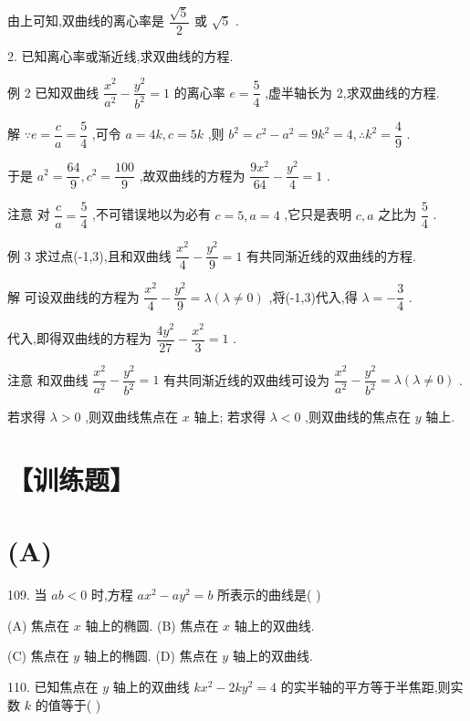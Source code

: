 由上可知,双曲线的离心率是 $\dfrac{\sqrt{5}}{2}$ 或 $\sqrt{5}$ .

2. 已知离心率或渐近线,求双曲线的方程.

例 2 已知双曲线 $\dfrac{{x}^{2}}{{a}^{2}} - \dfrac{{y}^{2}}{{b}^{2}} = 1$ 的离心率 $e = \dfrac{5}{4}$ ,虚半轴长为 2,求双曲线的方程.

解 $\because e = \dfrac{c}{a} = \dfrac{5}{4}$ ,可令 $a = {4k},c = {5k}$ ,则 ${b}^{2} = {c}^{2} - {a}^{2} = 9{k}^{2} = 4,\therefore {k}^{2} = \dfrac{4}{9}$ .

于是 ${a}^{2} = \dfrac{64}{9},{c}^{2} = \dfrac{100}{9}$ ,故双曲线的方程为 $\dfrac{9{x}^{2}}{64} - \dfrac{{y}^{2}}{4} = 1$ .

注意 对 $\dfrac{c}{a} = \dfrac{5}{4}$ ,不可错误地以为必有 $c = 5,a = 4$ ,它只是表明 $c,a$ 之比为 $\dfrac{5}{4}$ .

例 3 求过点(-1,3),且和双曲线 $\dfrac{{x}^{2}}{4} - \dfrac{{y}^{2}}{9} = 1$ 有共同渐近线的双曲线的方程.

解 可设双曲线的方程为 $\dfrac{{x}^{2}}{4} - \dfrac{{y}^{2}}{9} = \lambda \left( {\lambda  \neq  0}\right)$ ,将(-1,3)代入,得 $\lambda  =  - \dfrac{3}{4}$ .

代入,即得双曲线的方程为 $\dfrac{4{y}^{2}}{27} - \dfrac{{x}^{2}}{3} = 1$ .

注意 和双曲线 $\dfrac{{x}^{2}}{{a}^{2}} - \dfrac{{y}^{2}}{{b}^{2}} = 1$ 有共同渐近线的双曲线可设为 $\dfrac{{x}^{2}}{{a}^{2}} - \dfrac{{y}^{2}}{{b}^{2}} = \lambda \left( {\lambda  \neq  0}\right)$ .

若求得 $\lambda  > 0$ ,则双曲线焦点在 $x$ 轴上; 若求得 $\lambda  < 0$ ,则双曲线的焦点在 $y$ 轴上.

\section*{【训练题】}

\section*{(A)}

109. 当 ${ab} < 0$ 时,方程 $a{x}^{2} - a{y}^{2} = b$ 所表示的曲线是(   )

(A) 焦点在 $x$ 轴上的椭圆. (B) 焦点在 $x$ 轴上的双曲线.

(C) 焦点在 $y$ 轴上的椭圆. (D) 焦点在 $y$ 轴上的双曲线.

110. 已知焦点在 $y$ 轴上的双曲线 $k{x}^{2} - {2k}{y}^{2} = 4$ 的实半轴的平方等于半焦距,则实数 $k$ 的值等于(   )

